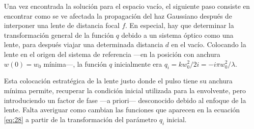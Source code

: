 \documentclass{scrartcl} %
\begin{document}
Una vez encontrada la solución para el espacio vacío, el siguiente paso consiste en encontrar como se ve afectada la propagación del haz Gaussiano después de interponer una lente de distancia focal $f$. En especial, hay que determinar la transformación general de la función $q$ debido a un sistema óptico como una lente, para después viajar una determinada distancia $d$ en el vacío. Colocando la lente en el origen del sistema de referencia ---en la posición con anchura $w(0) = w_{0}$ mínima---, la función $q$ inicialmente era $q_{i} = kw^{2}_{0}/2i = -i \pi w^{2}_{0}/\lambda$.

Esta colocación estratégica de la lente justo donde el pulso tiene su anchura mínima permite, recuperar la condición inicial utilizada para la envolvente, pero introduciendo un factor de fase ---a priori--- desconocido debido al enfoque de la lente. Falta averiguar como cambian las funciones que aparecen en la ecuación \eqref{eq:28} a partir de la transformación del parámetro $q_{i}$ inicial. 
\end{document}
